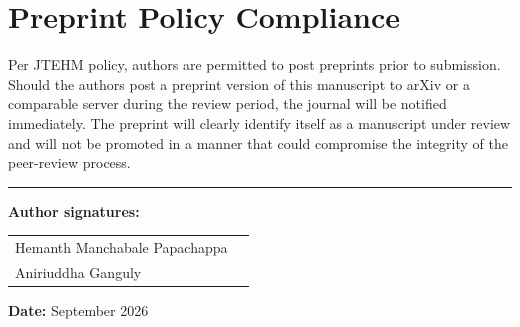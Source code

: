 \documentclass[11pt]{article}
\begin{document}
\bigskip
\section*{Preprint Policy Compliance}

Per JTEHM policy, authors are permitted to post preprints prior to submission.
Should the authors post a preprint version of this manuscript to arXiv or a
comparable server during the review period, the journal will be notified immediately.
The preprint will clearly identify itself as a manuscript under review and will not
be promoted in a manner that could compromise the integrity of the peer-review process.

\bigskip
\noindent\rule{\textwidth}{0.4pt}

\bigskip
\noindent\textbf{Author signatures:}

\bigskip
\noindent\begin{tabular}{ll}
Hemanth Manchabale Papachappa & \underline{\hspace{6cm}} \\[12pt]
Aniriuddha Ganguly             & \underline{\hspace{6cm}} \\
\end{tabular}

\bigskip
\noindent\textbf{Date:} September 2026
\end{document}
